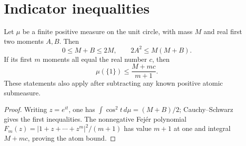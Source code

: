 \section{Indicator inequalities}\label{sec:moments}
\begin{lemma}\label{core:lem:measure-tools}
Let $\mu$ be a finite positive measure on the unit circle, with mass
$M$ and real first two moments $A,B$. Then
\[
 0\le M+B\le2M,\qquad 2A^2\le M(M+B).
\]
If its first $m$ moments all equal the real number $c$, then
\[
 \mu(\{1\})\le\frac{M+mc}{m+1}.
\]
These statements also apply after subtracting any known positive
atomic submeasure.
\end{lemma}
\begin{proof}
Writing $z=e^{it}$, one has
$\int\cos^2t\,d\mu=(M+B)/2$; Cauchy--Schwarz gives the first
inequalities. The nonnegative Fej\'er polynomial
$F_m(z)=|1+z+\cdots+z^m|^2/(m+1)$ has value $m+1$ at one and
integral $M+mc$, proving the atom bound.
\end{proof}

